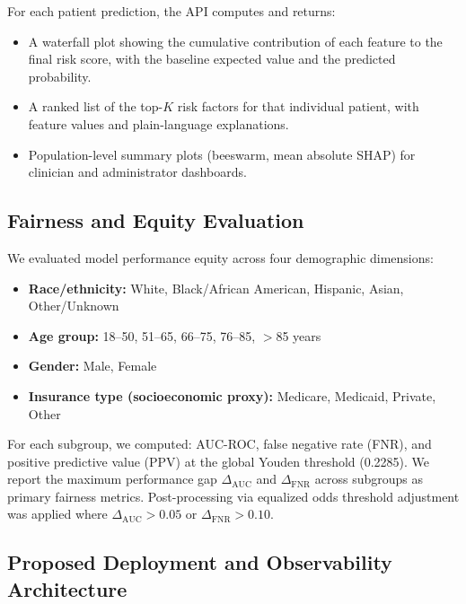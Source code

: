 \documentclass[11pt,letterpaper]{article}
\begin{document}
For each patient prediction, the API computes and returns:

\begin{itemize}[leftmargin=1.5em,itemsep=0.1em]
  \item A waterfall plot showing the cumulative contribution of each feature to the final risk score, with the baseline expected value and the predicted probability.
  \item A ranked list of the top-$K$ risk factors for that individual patient, with feature values and plain-language explanations.
  \item Population-level summary plots (beeswarm, mean absolute SHAP) for clinician and administrator dashboards.
\end{itemize}

\subsection{Fairness and Equity Evaluation}
\label{sec:fairness}

We evaluated model performance equity across four demographic dimensions:

\begin{itemize}[leftmargin=1.5em,itemsep=0.1em]
  \item \textbf{Race/ethnicity:} White, Black/African American, Hispanic, Asian, Other/Unknown
  \item \textbf{Age group:} 18--50, 51--65, 66--75, 76--85, $>$85 years
  \item \textbf{Gender:} Male, Female
  \item \textbf{Insurance type (socioeconomic proxy):} Medicare, Medicaid, Private, Other
\end{itemize}

For each subgroup, we computed: AUC-ROC, false negative rate (FNR), and positive predictive value (PPV) at the global Youden threshold (0.2285). We report the maximum performance gap $\Delta_{\text{AUC}}$ and $\Delta_{\text{FNR}}$ across subgroups as primary fairness metrics. Post-processing via equalized odds threshold adjustment \citep{hardt2016equality} was applied where $\Delta_{\text{AUC}} > 0.05$ or $\Delta_{\text{FNR}} > 0.10$.

\subsection{Proposed Deployment and Observability Architecture}
\label{sec:deployment}
\end{document}
